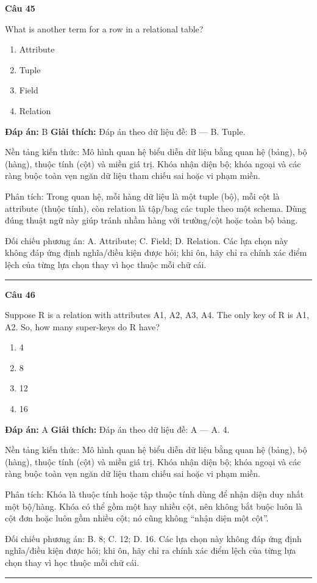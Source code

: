 \documentclass[11pt,a4paper]{article}
\newenvironment{question}[1]{%
  \par\vspace{1em}\noindent\textbf{\large Câu #1}\par\vspace{0.4em}
}{%
  \par\vspace{1em}\hrule\vspace{0.6em}
}
\newenvironment{choices}{%
  \begin{enumerate}[label=\textbf{\Alph*.},leftmargin=2.2em,itemsep=2pt,topsep=3pt]
}{%
  \end{enumerate}
}
\newcommand{\choice}{\item}
\begin{document}
\begin{question}{45}
What is another term for a row in a relational table?
\begin{choices}
\choice Attribute
\choice Tuple
\choice Field
\choice Relation
\end{choices}
\textbf{Đáp án:} B
\textbf{Giải thích:} Đáp án theo dữ liệu đề: B — B. Tuple.

Nền tảng kiến thức: Mô hình quan hệ biểu diễn dữ liệu bằng quan hệ (bảng), bộ (hàng), thuộc tính (cột) và miền giá trị. Khóa nhận diện bộ; khóa ngoại và các ràng buộc toàn vẹn ngăn dữ liệu tham chiếu sai hoặc vi phạm miền.

Phân tích: Trong quan hệ, mỗi hàng dữ liệu là một tuple (bộ), mỗi cột là attribute (thuộc tính), còn relation là tập/bag các tuple theo một schema. Dùng đúng thuật ngữ này giúp tránh nhầm hàng với trường/cột hoặc toàn bộ bảng.

Đối chiếu phương án: A. Attribute; C. Field; D. Relation. Các lựa chọn này không đáp ứng định nghĩa/điều kiện được hỏi; khi ôn, hãy chỉ ra chính xác điểm lệch của từng lựa chọn thay vì học thuộc mỗi chữ cái.
\end{question}

\begin{question}{46}
Suppose R is a relation with attributes A1, A2, A3, A4.
The only key of R is {A1, A2}. So, how many super-keys do R have?
\begin{choices}
\choice 4
\choice 8
\choice 12
\choice 16
\end{choices}
\textbf{Đáp án:} A
\textbf{Giải thích:} Đáp án theo dữ liệu đề: A — A. 4.

Nền tảng kiến thức: Mô hình quan hệ biểu diễn dữ liệu bằng quan hệ (bảng), bộ (hàng), thuộc tính (cột) và miền giá trị. Khóa nhận diện bộ; khóa ngoại và các ràng buộc toàn vẹn ngăn dữ liệu tham chiếu sai hoặc vi phạm miền.

Phân tích: Khóa là thuộc tính hoặc tập thuộc tính dùng để nhận diện duy nhất một bộ/hàng. Khóa có thể gồm một hay nhiều cột, nên không bắt buộc luôn là cột đơn hoặc luôn gồm nhiều cột; nó cũng không “nhận diện một cột”.

Đối chiếu phương án: B. 8; C. 12; D. 16. Các lựa chọn này không đáp ứng định nghĩa/điều kiện được hỏi; khi ôn, hãy chỉ ra chính xác điểm lệch của từng lựa chọn thay vì học thuộc mỗi chữ cái.
\end{question}
\end{document}
